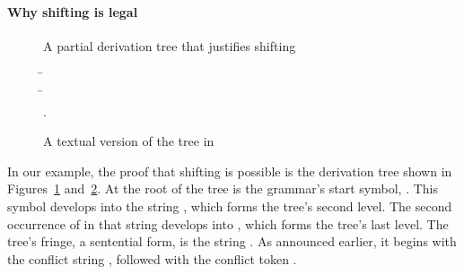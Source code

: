 \documentclass[onecolumn,11pt,nocopyrightspace,preprint]{sigplanconf}
\begin{document}
\paragraph{Why shifting is legal}

\begin{figure}
\mycommonbaseline
\begin{center}
\end{center}
\caption{A partial derivation tree that justifies shifting}
\label{fig:shifting:tree}
\end{figure}

\begin{figure}
\begin{center}
\begin{tabbing}
\=  \\
\>    \=  \\
\>                                         \>    
                                              .  
\end{tabbing}
\end{center}
\caption{A textual version of the tree in }
\label{fig:shifting:text}
\end{figure}

In our example, the proof that shifting is possible is the derivation tree
shown in Figures~\ref{fig:shifting:tree} and~\ref{fig:shifting:text}. At the
root of the tree is the grammar's start symbol, . This symbol
develops into the string , which forms the
tree's second level. The second occurrence of  in that string
develops into , which forms
the tree's last level. The tree's fringe, a sentential form, is the string
. As
announced earlier, it begins with the conflict string , followed with the conflict token
.
\end{document}
